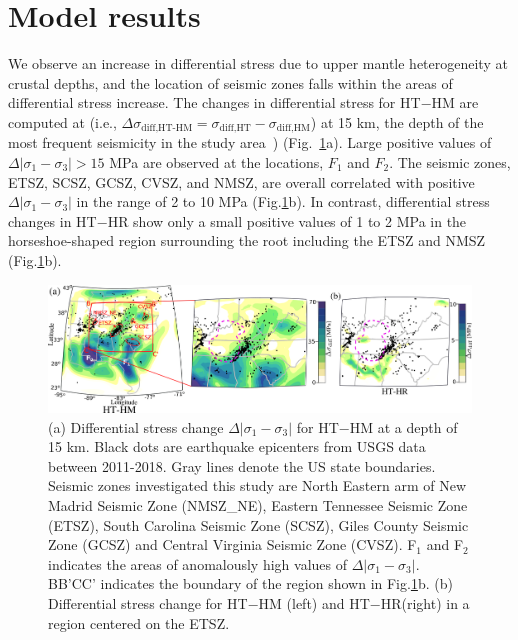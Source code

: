 \documentclass[draft,linenumbers]{agujournal2018}
\begin{document}
\section{Model results}
%
We observe an increase in differential stress due to upper mantle heterogeneity at crustal depths, and the location of seismic zones falls within the areas of differential stress increase. The changes in differential stress for HT$-$HM are computed at (i.e., $\Delta \sigma_{\text{diff,HT-HM}} = \sigma_{\text{diff,HT}}-\sigma_{\text{diff,HM}}$)
at 15 km, the depth of the most frequent seismicity in the study area~\citep[e.g.,][]{mazzotti2010state}) (Fig.~\ref{df_model}a). Large positive values of $\Delta |\sigma_1 - \sigma_3|>15$ MPa are observed at the locations, $F_1$ and $F_2$. The seismic zones, ETSZ, SCSZ, GCSZ, CVSZ, and NMSZ, are overall correlated with positive $\Delta |\sigma_1 - \sigma_3|$ in the range of 2 to 10 MPa (Fig.\ref{df_model}b). In contrast, differential stress changes in HT$-$HR show only a small positive values of 1 to 2 MPa in the horseshoe-shaped region surrounding the root including the ETSZ and NMSZ (Fig.\ref{df_model}b).
%
\begin{figure}[h!]
    \centering
    \includegraphics[width=0.75\linewidth]{figures/diff_stress_model.png}
    \caption{(a) Differential stress change $\Delta|\sigma_1-\sigma_3|$ for HT$-$HM at a depth of 15 km. Black dots are earthquake epicenters from USGS data between 2011-2018. Gray lines denote the US state boundaries. Seismic zones investigated this study are North Eastern arm of New Madrid Seismic Zone (NMSZ\_NE), Eastern Tennessee Seismic Zone (ETSZ), South Carolina Seismic Zone (SCSZ), Giles County Seismic Zone (GCSZ) and Central Virginia Seismic Zone (CVSZ). F$_1$ and F$_2$ indicates the areas of anomalously high values of $\Delta|\sigma_1 - \sigma_3|$. BB'CC' indicates the boundary of the region shown in Fig.\ref{df_model}b. (b) Differential stress change for HT$-$HM (left) and HT$-$HR(right) in a region centered on the ETSZ.}
    \label{df_model}
\end{figure}
\end{document}
